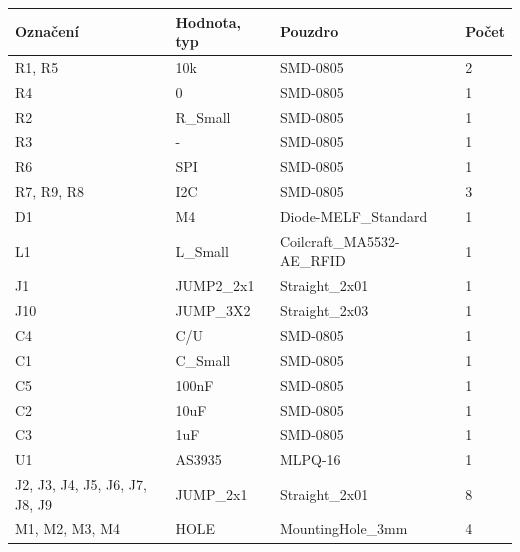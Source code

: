 \begin{center}
  \begin{tabular}{ | l | l | l | l |}
    \hline
    Označení & Hodnota, typ & Pouzdro & Počet \\ \hline
    \hline
			R1, R5 & 10k & SMD-0805 & 2\\ \hline
			R4 & 0 & SMD-0805 & 1\\ \hline
			R2 & R\_Small & SMD-0805 & 1\\ \hline
			R3 & - & SMD-0805 & 1\\ \hline
			R6 & SPI & SMD-0805 & 1\\ \hline
			R7, R9, R8 & I2C & SMD-0805 & 3\\ \hline
			D1 & M4 & Diode-MELF\_Standard & 1\\ \hline
			L1 & L\_Small & Coilcraft\_MA5532-AE\_RFID & 1\\ \hline
			J1 & JUMP2\_2x1 & Straight\_2x01 & 1\\ \hline
			J10 & JUMP\_3X2 & Straight\_2x03 & 1\\ \hline
			C4 & C/U & SMD-0805 & 1\\ \hline
			C1 & C\_Small & SMD-0805 & 1\\ \hline
			C5 & 100nF & SMD-0805 & 1\\ \hline
			C2 & 10uF & SMD-0805 & 1\\ \hline
			C3 & 1uF & SMD-0805 & 1\\ \hline
			U1 & AS3935 & MLPQ-16 & 1\\ \hline
			J2, J3, J4, J5, J6, J7, J8, J9 & JUMP\_2x1 & Straight\_2x01 & 8\\ \hline
			M1, M2, M3, M4 & HOLE & MountingHole\_3mm & 4\\ \hline
	
  \end{tabular}
\end{center}